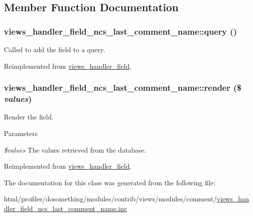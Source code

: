 \subsection{Member Function Documentation}
\hypertarget{classviews__handler__field__ncs__last__comment__name_a5394581513de0ee85a28aef8de302842}{
\subsubsection[{query}]{\setlength{\rightskip}{0pt plus 5cm}views\_\-handler\_\-field\_\-ncs\_\-last\_\-comment\_\-name::query ()}}
\label{classviews__handler__field__ncs__last__comment__name_a5394581513de0ee85a28aef8de302842}
Called to add the field to a query. 

Reimplemented from \hyperlink{classviews__handler__field_a4f661f91bcbe80d4a00c30a31456c502}{views\_\-handler\_\-field}.\hypertarget{classviews__handler__field__ncs__last__comment__name_aeb44418e481bfca1f6dbb249a1f5c665}{
\subsubsection[{render}]{\setlength{\rightskip}{0pt plus 5cm}views\_\-handler\_\-field\_\-ncs\_\-last\_\-comment\_\-name::render (\$ {\em values})}}
\label{classviews__handler__field__ncs__last__comment__name_aeb44418e481bfca1f6dbb249a1f5c665}
Render the field.


\begin{DoxyParams}{Parameters}
\item[{\em \$values}]The values retrieved from the database. \end{DoxyParams}


Reimplemented from \hyperlink{classviews__handler__field_a82ff951c5e9ceb97b2eab86f880cbc1e}{views\_\-handler\_\-field}.

The documentation for this class was generated from the following file:\begin{DoxyCompactItemize}
\item 
html/profiles/dosomething/modules/contrib/views/modules/comment/\hyperlink{views__handler__field__ncs__last__comment__name_8inc}{views\_\-handler\_\-field\_\-ncs\_\-last\_\-comment\_\-name.inc}\end{DoxyCompactItemize}
